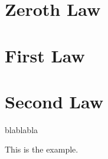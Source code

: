 \section{Zeroth Law}\label{zeroth_law}



\section{First Law}\label{first_law}


\section{Second Law}\label{second_law}





blablabla \cite{batchelor_1967} \cite{SmithVanNess_Book}

\begin{exmp}
This is the example.
\end{exmp}

